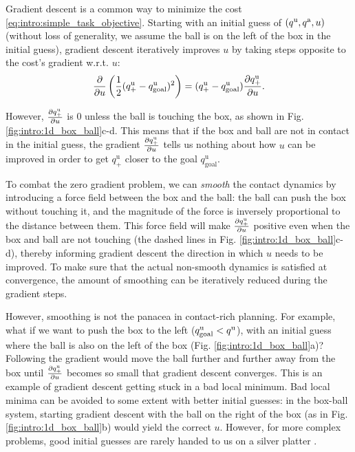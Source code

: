 Gradient descent is a common way to minimize the cost \eqref{eq:intro:simple_task_objective}. Starting with an initial guess of $({q^\mathrm{u}}, {q^\mathrm{a}}, u)$ (without loss of generality, we assume the ball is on the left of the box in the initial guess), gradient descent iteratively improves $u$ by taking steps opposite to the cost's gradient w.r.t. $u$:
\begin{equation}
\frac{\partial }{\partial u} \left(\frac{1}{2}(q^\mathrm{u}_+ - q^\mathrm{u}_\text{goal})^2\right)
= (q^\mathrm{u}_+ - q^\mathrm{u}_\text{goal}) \frac{\partial {q_+^\mathrm{u}}}{\partial {u}}.
\end{equation}

However, $\frac{\partial {q_+^\mathrm{u}}}{\partial {u}}$ is 0 unless the ball is touching the box, as shown in Fig. \ref{fig:intro:1d_box_ball}c-d. This means that if the box and ball are not in contact in the initial guess, the gradient $\frac{\partial {q_+^\mathrm{u}}}{\partial {u}}$ tells us nothing about how $u$ can be improved in order to get $q^\mathrm{u}_+$ closer to the goal $q^\mathrm{u}_\text{goal}$. 

To combat the zero gradient problem, we can \emph{smooth} the contact dynamics by introducing a force field between the box and the ball: the ball can push the box without touching it, and the magnitude of the force is inversely proportional to the distance between them. This force field will make $\frac{\partial {q_+^\mathrm{u}}}{\partial {u}}$ positive even when the box and ball are not touching (the dashed lines in Fig. \ref{fig:intro:1d_box_ball}c-d), thereby informing gradient descent the direction in which $u$ needs to be improved. To make sure that the actual non-smooth dynamics is satisfied at convergence, the amount of smoothing can be iteratively reduced during the gradient steps.

However, smoothing is not the panacea in contact-rich planning. For example, what if we want to push the box to the left ($q^\mathrm{u}_\text{goal} < {q^\mathrm{u}}$), with an initial guess where the ball is also on the left of the box (Fig. \ref{fig:intro:1d_box_ball}a)? Following the gradient would move the ball further and further away from the box until $\frac{\partial {q_+^\mathrm{u}}}{\partial {u}}$ becomes so small that gradient descent converges. This is an example of gradient descent getting stuck in a bad local minimum. Bad local minima can be avoided to some extent with better initial guesses: in the box-ball system, starting gradient descent with the ball on the right of the box (as in Fig. \ref{fig:intro:1d_box_ball}b) would yield the correct $u$. However, for more complex problems, good initial guesses are rarely handed to us on a silver platter \cite{onol2020tuning }.

